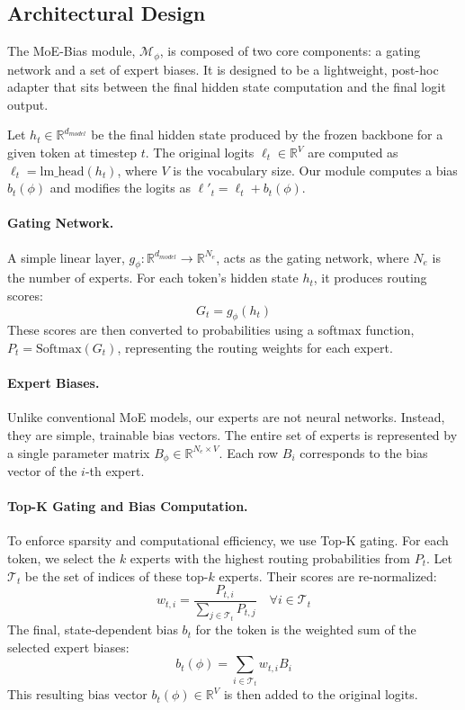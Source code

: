 \documentclass{article}
\begin{document}
\subsection{Architectural Design}

The MoE-Bias module, $\mathcal{M}_{\phi}$, is composed of two core components: a gating network and a set of expert biases. It is designed to be a lightweight, post-hoc adapter that sits between the final hidden state computation and the final logit output.

Let $h_t \in \mathbb{R}^{d_{model}}$ be the final hidden state produced by the frozen backbone for a given token at timestep $t$. The original logits $\ell_t \in \mathbb{R}^{V}$ are computed as $\ell_t = \text{lm\_head}(h_t)$, where $V$ is the vocabulary size. Our module computes a bias $b_t(\phi)$ and modifies the logits as $\ell'_t = \ell_t + b_t(\phi)$.

\paragraph{Gating Network.}
A simple linear layer, $g_\phi: \mathbb{R}^{d_{model}} \to \mathbb{R}^{N_e}$, acts as the gating network, where $N_e$ is the number of experts. For each token's hidden state $h_t$, it produces routing scores:
\begin{equation}
    G_t = g_\phi(h_t)
\end{equation}
These scores are then converted to probabilities using a softmax function, $P_t = \text{Softmax}(G_t)$, representing the routing weights for each expert.

\paragraph{Expert Biases.}
Unlike conventional MoE models, our experts are not neural networks. Instead, they are simple, trainable bias vectors. The entire set of experts is represented by a single parameter matrix $B_\phi \in \mathbb{R}^{N_e \times V}$. Each row $B_i$ corresponds to the bias vector of the $i$-th expert.

\paragraph{Top-K Gating and Bias Computation.}
To enforce sparsity and computational efficiency, we use Top-K gating. For each token, we select the $k$ experts with the highest routing probabilities from $P_t$. Let $\mathcal{T}_t$ be the set of indices of these top-$k$ experts. Their scores are re-normalized:
\begin{equation}
    w_{t,i} = \frac{P_{t,i}}{\sum_{j \in \mathcal{T}_t} P_{t,j}} \quad \forall i \in \mathcal{T}_t
\end{equation}
The final, state-dependent bias $b_t$ for the token is the weighted sum of the selected expert biases:
\begin{equation}
    b_t(\phi) = \sum_{i \in \mathcal{T}_t} w_{t,i} B_i
\end{equation}
This resulting bias vector $b_t(\phi) \in \mathbb{R}^{V}$ is then added to the original logits.
\end{document}
